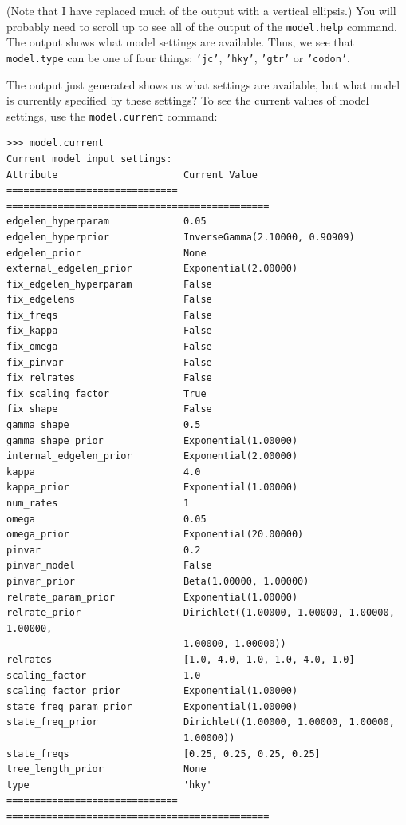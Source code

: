 \documentclass[10pt]{article}
\newcommand{\cmd}[1]{{\tt \small #1}\index{#1}}	%
\newcommand{\opt}[2]{{\tt \small #1.#2}\index{#1!#2}}	%
\newcommand{\optval}[1]{{\tt #1}}					%
\begin{document}
(Note that I have replaced much of the output with a vertical ellipsis.) You will probably need to scroll up to see all of the output of the \cmd{model.help} command. The output shows what model settings are available. Thus, we see that \opt{model}{type} can be one of four things: \optval{'jc'}, \optval{'hky'}, \optval{'gtr'} or \optval{'codon'}. 

The output just generated shows us what settings are available, but what model is currently specified by these settings? To see the current values of model settings, use the \cmd{model.current} command:
\begin{verbatim}
>>> model.current
Current model input settings:
Attribute                      Current Value
============================== ==============================================
edgelen_hyperparam             0.05
edgelen_hyperprior             InverseGamma(2.10000, 0.90909)
edgelen_prior                  None
external_edgelen_prior         Exponential(2.00000)
fix_edgelen_hyperparam         False
fix_edgelens                   False
fix_freqs                      False
fix_kappa                      False
fix_omega                      False
fix_pinvar                     False
fix_relrates                   False
fix_scaling_factor             True
fix_shape                      False
gamma_shape                    0.5
gamma_shape_prior              Exponential(1.00000)
internal_edgelen_prior         Exponential(2.00000)
kappa                          4.0
kappa_prior                    Exponential(1.00000)
num_rates                      1
omega                          0.05
omega_prior                    Exponential(20.00000)
pinvar                         0.2
pinvar_model                   False
pinvar_prior                   Beta(1.00000, 1.00000)
relrate_param_prior            Exponential(1.00000)
relrate_prior                  Dirichlet((1.00000, 1.00000, 1.00000, 1.00000,
                               1.00000, 1.00000))
relrates                       [1.0, 4.0, 1.0, 1.0, 4.0, 1.0]
scaling_factor                 1.0
scaling_factor_prior           Exponential(1.00000)
state_freq_param_prior         Exponential(1.00000)
state_freq_prior               Dirichlet((1.00000, 1.00000, 1.00000,
                               1.00000))
state_freqs                    [0.25, 0.25, 0.25, 0.25]
tree_length_prior              None
type                           'hky'
============================== ==============================================\end{verbatim}
\end{document}
